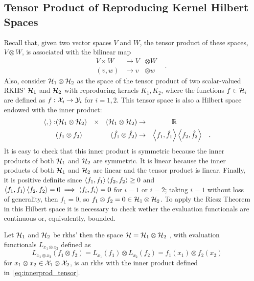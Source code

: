 \subsection{Tensor Product of Reproducing Kernel Hilbert Spaces}
Recall that, given two vector spaces $V$ and $W$, the tensor product of these spaces, $V \otimes W$, is associated with the bilinear map
\begin{equation}
    \nonumber
    \begin{aligned}
        &V \times W &\to V &\otimes W & \\
    &(v, w)  &\to v &\otimes w &
    \end{aligned}.
\end{equation}
Also, consider $\mathcal{H}_1 \otimes \mathcal{H}_2$ as the space of the tensor product of two scalar-valued RKHS' $\mathcal{H}_1$ and $\mathcal{H}_2$ with reproducing kernels $K_1, K_2$, where the functions $f \in \mathcal{H}_i$ are defined as $f: \mathcal{X}_i \to \mathcal{Y}_i$ for $i=1, 2$. This tensor space is also a Hilbert space endowed with the inner product:
\begin{equation}
    \label{eq:innerprod_tensor}
    \begin{aligned}
        \dotp{}{}: &(\rkhs_1 \otimes \rkhs_2) &\times& &(\rkhs_1 \otimes \rkhs_2) &\to &\reals &&  \\
    &(f_1 \otimes f_2) && &(\hat{f}_1 \otimes \hat{f}_2) &\to &\dotp{f_1}{\hat{f}_1} & \dotp{f_2}{\hat{f}_2} &.
    \end{aligned}
\end{equation}
It is easy to check that this inner product is symmetric because the inner products of both $\mathcal{H}_1$ and $\mathcal{H}_2$ are symmetric. It is linear because the inner products of both $\mathcal{H}_1$ and $\mathcal{H}_2$ are linear and the tensor product is linear. Finally, it is positive definite since 
$  \left\langle f_1, f_1 \right\rangle  \left\langle f_2, f_2 \right\rangle \geq 0$ and
$\left\langle f_1, f_1 \right\rangle  \left\langle f_2, f_2 \right\rangle = 0 \implies \left\langle f_i, f_i \right\rangle = 0$ for $i=1$ or $i=2$; taking $i=1$ without loss of generality, then $f_1 = 0$, so $f_1 \otimes f_2 = 0 \in \mathcal{H}_1 \otimes \mathcal{H}_2$. To apply the Riesz Theorem in this Hilbert space it is necessary to check wether the evaluation functionals are continuous or, equivalently, bounded.
%
\begin{proposition}
    Let $\mathcal{H}_1$ and $\mathcal{H}_2$ be \acrshort{rkhs}'  then
    the space $\mathcal{H} = \mathcal{H}_1 \otimes \mathcal{H}_2$ , with evaluation functionals $L_{x_1 \otimes x_2} $ defined as 
    $$L_{x_1 \otimes x_2} (f_1 \otimes f_2) =L_{x_1}(f_1) \otimes L_{x_2}(f_2) = f_1(x_1) \otimes f_2(x_2)$$
    for $x_1 \otimes x_2 \in \mathcal{X}_1 \otimes \mathcal{X}_2$,
     is an \acrshort{rkhs} with the inner product defined in~\eqref{eq:innerprod_tensor}. 
\end{proposition}
